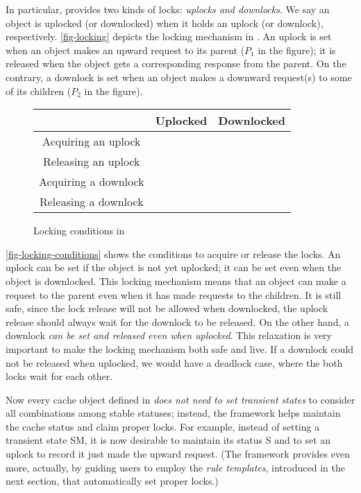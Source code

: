 In particular, \hemiola{} provides two kinds of locks: \emph{uplocks and downlocks}.
We say an object is uplocked (or downlocked) when it holds an uplock (or downlock), respectively.
\autoref{fig-locking} depicts the locking mechanism in \hemiola{}.
An uplock is set when an object makes an upward request to its parent ($P_1$ in the figure); it is released when the object gets a corresponding response from the parent.
On the contrary, a downlock is set when an object makes a downward request(s) to some of its children ($P_2$ in the figure).

\begin{figure}[h]
  \centering
  \renewcommand{\arraystretch}{1.2}
  \newcommand{\lockyes}{\cmark}
  \newcommand{\lockno}{\xmark}
  \begin{tabular}{ccc}
    \hline
    & Uplocked & Downlocked\\
    \hline
    Acquiring an uplock & \lockno & \lockyes\\
    Releasing an uplock & \lockyes & \lockno\\
    Acquiring a downlock & \lockyes & \lockno\\
    Releasing a downlock & \lockyes & \lockyes\\
    \hline
  \end{tabular}
  \caption{Locking conditions in \hemiola{}}
  \label{fig-locking-conditions}
\end{figure}

\autoref{fig-locking-conditions} shows the conditions to acquire or release the locks.
An uplock can be set if the object is not yet uplocked; it can be set even when the object is downlocked.
This locking mechanism means that an object can make a request to the parent even when it has made requests to the children.
It is still safe, since the lock release will not be allowed when downlocked, \ie{} the uplock release should always wait for the downlock to be released.
On the other hand, a downlock \emph{can be set and released even when uplocked}.
This relaxation is very important to make the locking mechanism both safe and live.
If a downlock could not be released when uplocked, we would have a deadlock case, where the both locks wait for each other.

Now every cache object defined in \hemiola{} \emph{does not need to set transient states} to consider all combinations among stable statuses;
instead, the framework helps maintain the cache status and claim proper locks.
For example, instead of setting a transient state SM, it is now desirable to maintain its status S and to set an uplock to record it just made the upward request.
(The framework provides even more, actually, by guiding users to employ the \emph{rule templates}, introduced in the next section, that automatically set proper locks.)

